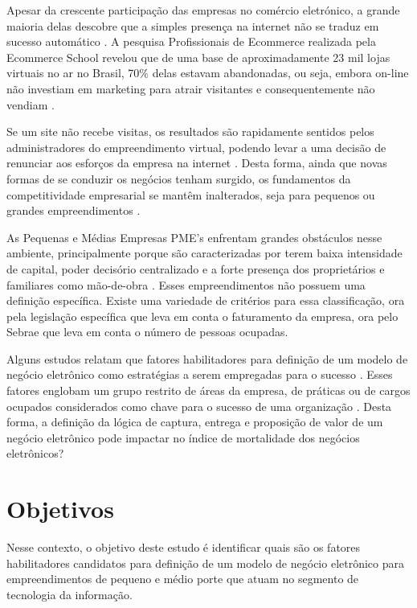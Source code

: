 Apesar da crescente participação das empresas no comércio eletrónico, a grande maioria delas descobre que a simples presença na internet não se traduz em sucesso automático \cite{rosanasantarosa2016}. A pesquisa Profissionais de Ecommerce realizada pela Ecommerce School revelou que de uma base de aproximadamente 23 mil lojas virtuais no ar no Brasil, 70\% delas estavam abandonadas, ou seja, embora on-line não investiam em marketing para atrair visitantes e consequentemente não vendiam \cite{ecommerceschool2015}. 

Se um site não recebe visitas, os resultados são rapidamente sentidos pelos administradores do empreendimento virtual, podendo levar a uma decisão de renunciar aos esforços da empresa na internet \cite{rosanasantarosa2016}. Desta forma, ainda que novas formas de se conduzir os negócios tenham surgido, os fundamentos da competitividade empresarial se mantêm inalterados, seja para pequenos ou grandes empreendimentos \cite{porter2001}. 

As Pequenas e Médias Empresas PME’s enfrentam grandes obstáculos nesse ambiente, principalmente porque são caracterizadas por terem baixa intensidade de capital, poder decisório centralizado e a forte presença dos proprietários e familiares como mão-de-obra \cite{IBGE2003}. Esses empreendimentos não possuem uma definição específica. Existe uma variedade de critérios para essa classificação, ora pela legislação específica que leva em conta o faturamento da empresa, ora pelo Sebrae que leva em conta o número de pessoas ocupadas.

Alguns estudos relatam que fatores habilitadores para definição de um modelo de negócio eletrônico como estratégias a serem empregadas para o sucesso \cite{criticalfactors2012}. Esses fatores englobam um grupo restrito de áreas da empresa, de práticas ou de cargos ocupados considerados como chave para o sucesso de uma organização \cite{criticalfactors2014}. Desta forma, a definição da lógica de captura, entrega e proposição de valor de um negócio eletrônico pode impactar no índice de mortalidade dos negócios eletrônicos?

\section{Objetivos}
\label{subsec:framing}

Nesse contexto, o objetivo deste estudo é identificar quais são os fatores habilitadores candidatos para definição de um modelo de negócio eletrônico para empreendimentos de pequeno e médio porte que atuam no segmento de tecnologia da informação.


